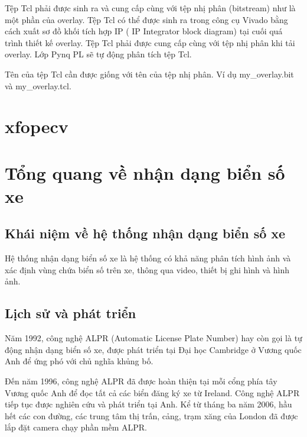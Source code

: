 		Tệp Tcl phải được sinh ra và cung cấp cùng với tệp nhị phân (bitstream) như là một phần của overlay. Tệp Tcl có thể được sinh ra trong công cụ Vivado bằng cách xuất sơ đồ khối tích hợp IP ( IP Integrator block diagram) tại cuối quá trình thiết kế overlay. Tệp Tcl phải được cung cấp cùng với tệp nhị phân khi tải overlay. Lớp Pynq PL sẽ tự động phân tích tệp Tcl.

		Tên của tệp Tcl cần được giống với tên của tệp nhị phân. Ví dụ 	my\_overlay.bit và my\_overlay.tcl.
	
	\section{xfopecv}
	
	\section{Tổng quang về nhận dạng biển số xe}
		\subsection{Khái niệm về hệ thống nhận dạng biển số xe}
		Hệ thống nhận dạng biển số xe là hệ thống có khả năng phân tích hình ảnh và xác định vùng chứa biển số trên xe, thông qua video, thiết bị ghi hình và hình ảnh.
		\subsection{Lịch sử và phát triển}
		Năm 1992, công nghệ ALPR (Automatic License Plate Number) hay còn gọi là tự động nhận dạng biển số xe, được phát triển tại Đại học Cambridge ở Vương quốc Anh để ứng phó với chủ nghĩa khủng bố.
		
	    Đến năm 1996, công nghệ ALPR đã được hoàn thiện tại mỗi cổng phía tây Vương quốc Anh để đọc tất cả các biển đăng ký xe từ Ireland. Công nghệ ALPR tiếp tục được nghiên cứu và phát triển tại Anh. Kể từ tháng ba năm 2006, hầu hết các con đường, các trung tâm thị trấn, cảng, trạm xăng của London đã được lắp đặt camera chạy phần mềm ALPR.
	    
